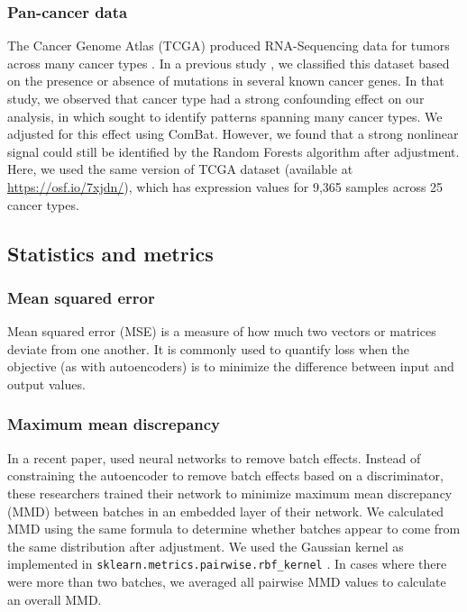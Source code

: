 \documentclass[11pt]{article}
\begin{document}
\subsubsection{Pan-cancer data}

The Cancer Genome Atlas (TCGA) produced RNA-Sequencing data for tumors across many cancer types \cite{the_cancer_genome_atlas_research_network_cancer_2013}.
In a previous study \cite{dayton_classifying_2017-1}, we classified this dataset based on the presence or absence of mutations in several known cancer genes.
In that study, we observed that cancer type had a strong confounding effect on our analysis, in which sought to identify patterns spanning many cancer types. We adjusted for this effect using ComBat.
However, we found that a strong nonlinear signal could still be identified by the Random Forests algorithm after adjustment.
Here, we used the same version of TCGA dataset (available at \url{https://osf.io/7xjdn/}),
which has expression values for 9,365 samples across 25 cancer types.

\subsection{Statistics and metrics}

\subsubsection{Mean squared error}

Mean squared error (MSE) is a measure of how much two vectors or matrices deviate from one another.
It is commonly used to quantify loss when the objective (as with autoencoders) is to minimize the difference between input and output values.

\subsubsection{Maximum mean discrepancy} \label{section:mmd}

In a recent paper, \citet{shaham_removal_2017} used neural networks to remove batch effects.
Instead of constraining the autoencoder to remove batch effects based on a discriminator, these researchers trained their network to minimize maximum mean discrepancy (MMD) between batches in an embedded layer of their network.
We calculated MMD using the same formula to determine whether batches appear to come from the same distribution after adjustment.
We used the Gaussian kernel as implemented in \texttt{sklearn.metrics.pairwise.rbf\_kernel} \cite{pedregosa_scikit-learn_2011}.
In cases where there were more than two batches, we averaged all pairwise MMD values to calculate an overall MMD.
\end{document}
